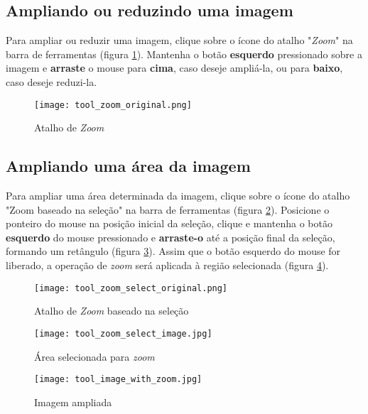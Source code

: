 \subsection{Ampliando ou reduzindo uma imagem}

Para ampliar ou reduzir uma imagem, clique sobre o ícone do atalho "\textit{Zoom}" na barra de
ferramentas (figura \ref{fig:zoom_icon}). Mantenha o botão \textbf{esquerdo} pressionado sobre
a imagem e \textbf{arraste} o mouse para \textbf{cima}, caso deseje ampliá-la, ou para \textbf{baixo},
caso deseje reduzi-la.

\begin{figure}[!htb]
\centering
\texttt{[image: tool\_zoom\_original.png]}
\caption{Atalho de \textit{Zoom}}
\label{fig:zoom_icon}
\end{figure}


\subsection{Ampliando uma área da imagem}

Para ampliar uma área determinada da imagem, clique sobre o ícone do atalho "Zoom baseado na seleção" 
na barra de ferramentas (figura \ref{fig:zoom_icon_loc}). Posicione o ponteiro do mouse na posição
inicial da seleção, clique e mantenha o botão \textbf{esquerdo} do mouse pressionado e \textbf{arraste-o}
até a posição final da seleção, formando um retângulo (figura \ref{fig:zoom_select}). Assim que o
botão esquerdo do mouse for liberado, a operação de \textit{zoom} será aplicada à região selecionada
(figura \ref{fig:zoom_applied}).

\begin{figure}[!htb]
\centering
\texttt{[image: tool\_zoom\_select\_original.png]}
\caption{Atalho de \textit{Zoom} baseado na seleção}
\label{fig:zoom_icon_loc}
\end{figure}

\begin{figure}[!htb]
\centering
\texttt{[image: tool\_zoom\_select\_image.jpg]}
\caption{Área selecionada para \textit{zoom}}
\label{fig:zoom_select}
\end{figure}

\begin{figure}[!htb]
\centering
\texttt{[image: tool\_image\_with\_zoom.jpg]}
\caption{Imagem ampliada}
\label{fig:zoom_applied}
\end{figure}


